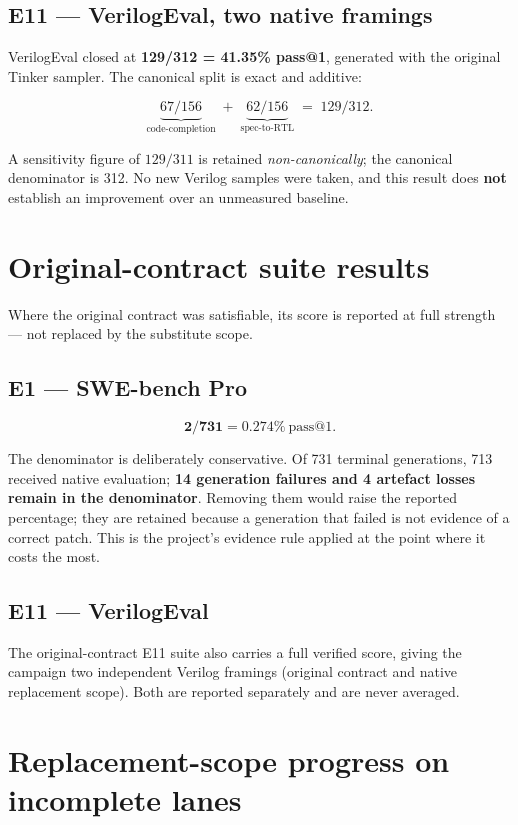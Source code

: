 \subsection{E11 --- VerilogEval, two native framings}

VerilogEval closed at \textbf{129/312 = 41.35\% pass@1}, generated with the
original Tinker sampler. The canonical split is exact and additive:

\[
\underbrace{67/156}_{\text{code-completion}} \;+\;
\underbrace{62/156}_{\text{spec-to-RTL}} \;=\; 129/312.
\]

A sensitivity figure of $129/311$ is retained \emph{non-canonically}; the
canonical denominator is 312. No new Verilog samples were taken, and this result
does \textbf{not} establish an improvement over an unmeasured baseline.

\section{Original-contract suite results}

Where the original contract was satisfiable, its score is reported at full
strength --- not replaced by the substitute scope.

\subsection{E1 --- SWE-bench Pro}

\[
\textbf{2/731} = 0.274\% \ \text{pass@1.}
\]

The denominator is deliberately conservative. Of 731 terminal generations, 713
received native evaluation; \textbf{14 generation failures and 4 artefact losses
remain in the denominator}. Removing them would raise the reported percentage;
they are retained because a generation that failed is not evidence of a correct
patch. This is the project's evidence rule applied at the point where it costs
the most.

\subsection{E11 --- VerilogEval}

The original-contract E11 suite also carries a full verified score, giving the
campaign two independent Verilog framings (original contract and native
replacement scope). Both are reported separately and are never averaged.

\section{Replacement-scope progress on incomplete lanes}

